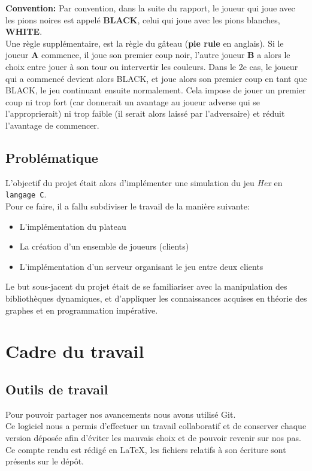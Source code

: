 \documentclass[a4paper,10pt]{article}
\begin{document}
\textbf{Convention:} Par convention, dans la suite du rapport, le joueur qui joue avec les pions noires est appelé \textbf{BLACK}, celui qui joue avec les pions blanches, \textbf{WHITE}.\\

Une règle supplémentaire, est la règle du gâteau (\textbf{pie rule} en anglais). Si le joueur \textbf{A} commence, il joue son premier coup noir, l'autre joueur \textbf{B} a alors le choix entre jouer à son tour ou intervertir les couleurs. Dans le 2e cas, le joueur qui a commencé devient alors BLACK, et joue alors son premier coup en tant que BLACK, le jeu continuant ensuite normalement. Cela impose de jouer un premier coup ni trop fort (car donnerait un avantage au joueur adverse qui se l'approprierait) ni trop faible (il serait alors laissé par l'adversaire) et réduit l'avantage de commencer. \\
\subsection{Problématique}
L'objectif du projet était alors d'implémenter une simulation du jeu \emph{Hex} en \texttt{langage C}.\\
Pour ce faire, il a fallu subdiviser le travail de la manière suivante:
\begin{itemize}
    \item L'implémentation du plateau 
    \item La création d'un ensemble de joueurs (clients)
    \item L'implémentation d'un serveur organisant le jeu entre deux clients
\end{itemize}
Le but sous-jacent du projet était de se familiariser avec la manipulation des bibliothèques dynamiques, et d'appliquer les connaissances acquises en théorie des graphes et en programmation impérative. 

\section{Cadre du travail}
\subsection{Outils de travail}
Pour pouvoir partager nos avancements nous avons utilisé Git.\\ Ce logiciel nous a permis d’effectuer un travail collaboratif et de conserver chaque version déposée afin d’éviter les mauvais choix et de pouvoir revenir sur nos pas.\\
Ce compte rendu est rédigé en \LaTeX, les fichiers relatifs à son écriture sont présents sur le dépôt.
\end{document}
